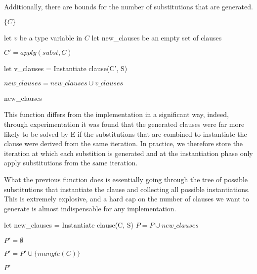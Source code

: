 \documentclass[]{ceurart}
\begin{document}
Additionally, there are bounds for the number of substitutions that are generated.

\begin{algorithm}[tbh]
\begin{algorithmic}[1]


      \State \Return \(\{C\}\)

   \Else

      \State let \(v\) be a type variable in \(C\)
      \State let new\_clauses be an empty set of clauses



            \State \(C' = apply(subst, C)\)

            \State let v\_clauses = Instantiate clause(C', S)

         \EndIf

         \State \( new\_clauses = new\_clauses \cup v\_clauses\)

      \EndFor

      \State \Return new\_clauses
   \EndIf

\EndFunction
\end{algorithmic}
\end{algorithm}
This function differs from the implementation in a significant way, indeed, through experimentation it was found that the generated clauses were far more likely to be solved by E if the substitutions that are combined to instantiate the clause were derived from the same iteration. In practice, we therefore store the iteration at which each substition is generated and at the instantiation phase only apply substitutions from the same iteration.


What the previous function does is essentially going through the tree of possible substitutions that instantiate the clause and collecting all possible instantiations. This is extremely explosive, and a hard cap on the number of clauses we want to generate is almost indispensable for any implementation.

\begin{algorithm}[tbh]
\begin{algorithmic}[1]

   \State let new\_clauses = Instantiate clause(C, S)
   \State \(P = P \cup new\_clauses\)
\EndFor

\State \(P' = \emptyset \)

      \State \(P' = P' \cup \{mangle(C)\}\)
   \EndIf
\EndFor

\State \Return \(P'\)

\EndFunction
\end{algorithmic}
\end{algorithm}
\end{document}

